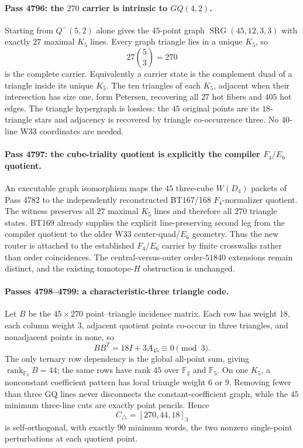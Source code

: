\paragraph{Pass 4796: the $270$ carrier is intrinsic to $GQ(4,2)$.}
Starting from $Q^-(5,2)$ alone gives the $45$-point graph $\operatorname{SRG}(45,12,3,3)$ with exactly $27$ maximal $K_5$ lines.  Every graph triangle lies in a unique $K_5$, so
\[
 27\binom53=270
\]
is the complete carrier.  Equivalently a carrier state is the complement duad of a triangle inside its unique $K_5$.  The ten triangles of each $K_5$, adjacent when their intersection has size one, form Petersen, recovering all $27$ hot fibers and $405$ hot edges.  The triangle hypergraph is lossless: the $45$ original points are its $18$-triangle stars and adjacency is recovered by triangle co-occurrence three.  No $40$-line W33 coordinates are needed.

\paragraph{Pass 4797: the cube-triality quotient is explicitly the compiler $F_4/E_6$ quotient.}
An executable graph isomorphism maps the $45$ three-cube $W(D_4)$ packets of Pass 4782 to the independently reconstructed BT167/168 $F_4$-normalizer quotient.  The witness preserves all $27$ maximal $K_5$ lines and therefore all $270$ triangle states.  BT169 already supplies the explicit line-preserving second leg from the compiler quotient to the older W33 center-quad/$E_6$ geometry.  Thus the new router is attached to the established $F_4/E_6$ carrier by finite crosswalks rather than order coincidences.  The central-versus-outer order-$51840$ extensions remain distinct, and the existing tomotope-$H$ obstruction is unchanged.

\paragraph{Passes 4798--4799: a characteristic-three triangle code.}
Let $B$ be the $45\times270$ point--triangle incidence matrix.  Each row has weight $18$, each column weight $3$, adjacent quotient points co-occur in three triangles, and nonadjacent points in none, so
\[
 BB^T=18I+3A_{45}\equiv0\pmod3.
\]
The only ternary row dependency is the global all-point sum, giving $\operatorname{rank}_{\mathbb F_3}B=44$; the same rows have rank $45$ over $\mathbb F_2$ and $\mathbb F_5$.  On one $K_5$, a nonconstant coefficient pattern has local triangle weight $6$ or $9$.  Removing fewer than three GQ lines never disconnects the constant-coefficient graph, while the $45$ minimum three-line cuts are exactly point pencils.  Hence
\[
 \boxed{C_\triangle=[270,44,18]_3}
\]
is self-orthogonal, with exactly $90$ minimum words, the two nonzero single-point perturbations at each quotient point.

